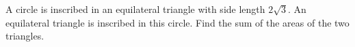 A circle is inscribed in an equilateral triangle with side length $2\sqrt3$. An equilateral triangle is inscribed in this circle. Find the sum of the areas of the two triangles.
